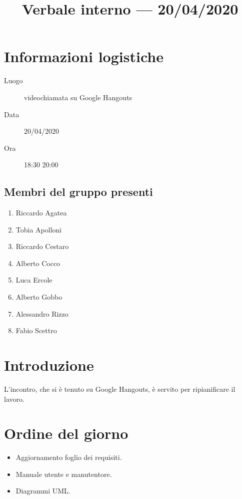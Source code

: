 \documentclass{article}
\title{Verbale interno --- 20/04/2020}
\begin{document}


\section{Informazioni logistiche}%
\label{sec:informazioni_logistiche}

\begin{description}
  \item [Luogo] videochiamata su Google Hangouts
  \item [Data] 20/04/2020
  \item [Ora] 18:30  20:00
\end{description}

\subsection{Membri del gruppo presenti}%
\label{sub:membri_del_gruppo_presenti}

\begin{enumerate}
  \item Riccardo Agatea
  \item Tobia Apolloni
  \item Riccardo Cestaro
  \item Alberto Cocco
  \item Luca Ercole
  \item Alberto Gobbo
  \item Alessandro Rizzo
  \item Fabio Scettro
\end{enumerate}

\section{Introduzione}%
\label{sec:introduzione}

L'incontro, che si è tenuto su Google Hangouts, è servito per ripianificare il lavoro.

\section{Ordine del giorno}%
\label{sec:ordine_del_giorno}
\begin{itemize}
  \item Aggiornamento foglio dei requisiti.
  \item Manuale utente e manutentore.
  \item Diagrammi UML\@.
\end{itemize}
\end{document}
